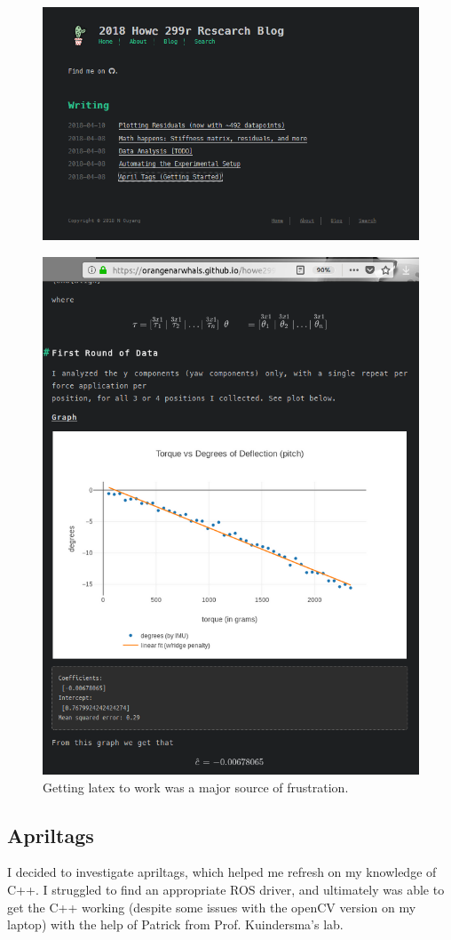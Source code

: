 \documentclass[12pt]{article}
\begin{document}
\begin{figure}[H]
\centering
\includegraphics[width=.8\textwidth]{images/misc/blog.png}
\end{figure}


\begin{figure}[H]
\centering
\includegraphics[width=.8\textwidth]{images/misc/blog_latex.png}
\caption{Getting latex to work was a major source of frustration.}
\end{figure}

\subsection{Apriltags}
I decided to investigate apriltags, which helped me refresh on my knowledge of C++. I struggled to
find an appropriate ROS driver, and ultimately was able to get the C++ working (despite some issues
with the openCV version on my laptop) with the help of Patrick from Prof. Kuindersma's lab.
\end{document}
